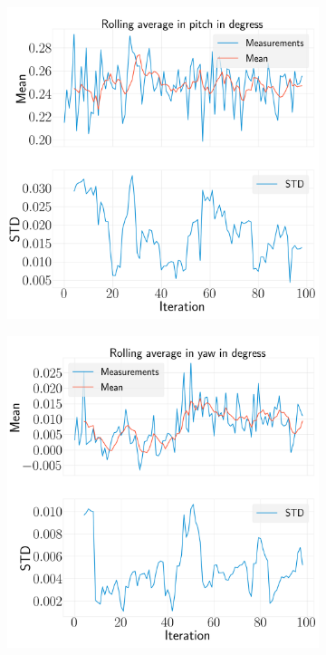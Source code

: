 \documentclass[../Head/report.tex]{subfiles}
\begin{document}
\begin{figure}[H]
\begin{subfigure}[t]{.30\textwidth}
        \includegraphics[width=\textwidth]{../Figures/analyse_rolling_average/test2/Calculated_rolling_average_in_pitch_with_mean_and_STD.png}
        \caption{}
        \label{fig:rolling_average_in_pitch_test2}
    \end{subfigure}
     \hspace{0.2em}
    \begin{subfigure}[t]{.30\textwidth}
        \centering
        \includegraphics[width=\textwidth]{../Figures/analyse_rolling_average/test2/Calculated_rolling_average_in_yaw_with_mean_and_STD.png}

\end{subfigure}
\end{figure}
\end{document}
